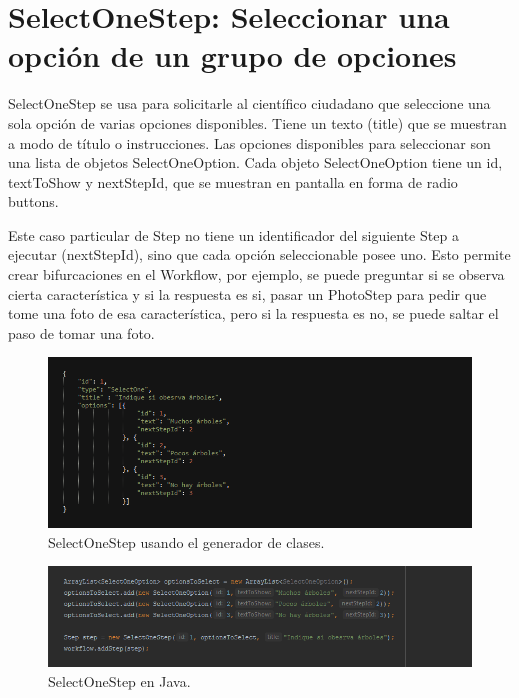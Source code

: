 \section{SelectOneStep: Seleccionar una opción de un grupo de opciones}
SelectOneStep  se usa para solicitarle al científico ciudadano que seleccione una sola opción de varias opciones disponibles. Tiene un texto (title) que se muestran a modo de título o instrucciones. Las opciones disponibles para seleccionar son una lista de objetos SelectOneOption.
Cada objeto SelectOneOption tiene un id, textToShow y nextStepId, que se muestran en pantalla en forma de radio buttons.

Este caso particular de Step no tiene un identificador del siguiente Step a ejecutar (nextStepId), sino que cada opción seleccionable posee uno. Esto permite crear bifurcaciones en el Workflow, por ejemplo, se puede preguntar si se observa cierta característica y si la respuesta es si, pasar un PhotoStep para pedir que tome una foto de esa característica, pero si la respuesta es no, se puede saltar el paso de tomar una foto.

\begin{figure}[H]
  \centering
    \includegraphics[scale=0.6]{50-anexos/C-steps/select_one_json.png} 
    \caption{SelectOneStep usando el generador de clases.}
\end{figure}	

\begin{figure}[H]
  \centering
    \includegraphics[scale=0.6]{50-anexos/C-steps/select_one_java.png} 
    \caption{SelectOneStep en Java.}
\end{figure}


